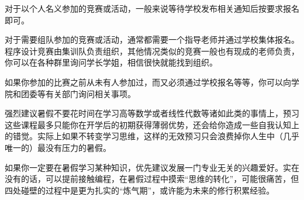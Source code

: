 
对于以个人名义参加的竞赛或活动，一般来说等待学校发布相关通知后按要求报名即可。

对于需要组队参加的竞赛或活动，通常都需要一个指导老师并通过学校集体报名。程序设计竞赛由集训队负责组织，其他情况类似的竞赛一般也有现成的老师负责，你可以在各种群里询问学长学姐，相信很快就能找到组织。

如果你参加的比赛之前从未有人参加过，而又必须通过学校报名等等，你可以向学院和团委等有关部门询问相关事项。


强烈建议暑假不要花时间在学习高等数学或者线性代数等诸如此类的事情上，预习这些课程最多只能你在开学后的初期获得薄弱优势，还会给你造成一些自我认知上的错觉。实际上如果不转变学习思维，这样的无效预习只会浪费掉你人生中（几乎唯一的）最没有压力的暑假。

如果你一定要在暑假学习某种知识，优先建议发展一门专业无关的兴趣爱好。实在没有的话，可以提前接触编程，在暑假过程中摸索“思维的转化”，可能很痛苦，但四处碰壁的过程中是更为扎实的“炼气期”，或许能为未来的修行积累经验。
